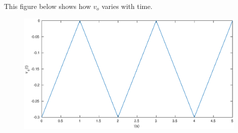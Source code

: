 \documentclass{article}
\begin{document}
This figure below shows how $v_o$ varies with time.

\begin{figure}[H]
  \centering
  \includegraphics[width=\linewidth]{figures/Problem4-3}
  \label{fig:}
\end{figure}
\end{document}
